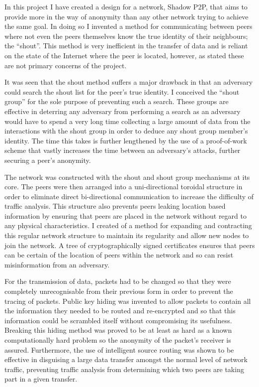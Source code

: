 \documentclass[ %
                    author={Luke Murray},
                supervisor={Dr. Simon Hollis},
                     title={Shadow Peer-to-Peer Networks},
                  subtitle={},
                    degree={MEng},
                      year={2013} ]{thesis}
\begin{document}
In this project I have created a design for a network, Shadow P2P, that aims to provide more in the way of anonymity than any other network trying to achieve the same goal. In doing so I invented a method for communicating between peers where not even the peers themselves know the true identity of their neighbours; the ``shout''. This method is very inefficient in the transfer of data and is reliant on the state of the Internet where the peer is located, however, as stated these are not primary concerns of the project.

It was seen that the shout method suffers a major drawback in that an adversary could search the shout list for the peer's true identity. I conceived the ``shout group'' for the sole purpose of preventing such a search. These groups are effective in deterring any adversary from performing a search as an adversary would have to spend a very long time collecting a large amount of data from the interactions with the shout group in order to deduce any shout group member's identity. The time this takes is further lengthened by the use of a proof-of-work scheme that vastly increases the time between an adversary's attacks, further securing a peer's anonymity.

The network was constructed with the shout and shout group mechanisms at its core. The peers were then arranged into a uni-directional toroidal structure in order to eliminate direct bi-directional communication to increase the difficulty of traffic analysis. This structure also prevents peers leaking location based information by ensuring that peers are placed in the network without regard to any physical characteristics. I created of a method for expanding and contracting this regular network structure to maintain its regularity and allow new nodes to join the network. A tree of cryptographically signed certificates ensures that peers can be certain of the location of peers within the network and so can resist misinformation from an adversary. 

For the transmission of data, packets had to be changed so that they were completely unrecognisable from their previous form in order to prevent the tracing of packets. Public key hiding was invented to allow packets to contain all the information they needed to be routed and re-encrypted and so that this information could be scrambled itself without compromising its usefulness. Breaking this hiding method was proved to be at least as hard as a known computationally hard problem so the anonymity of the packet's receiver is assured. Furthermore, the use of intelligent source routing was shown to be effective in disguising a large data transfer amongst the normal level of network traffic, preventing traffic analysis from determining which two peers are taking part in a given transfer.
\end{document}
